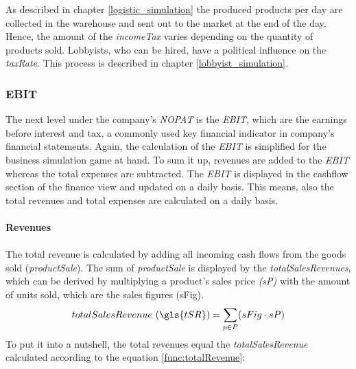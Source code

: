 As described in chapter \ref{logistic_simulation} the produced products per day are collected in the warehouse and sent out to the market at the end of the day. Hence, the amount of the \textit{incomeTax} varies depending on the quantity of products sold. Lobbyists, who can be hired, have a political influence on the \textit{taxRate}. This process is described in chapter \ref{lobbyist_simulation}.

\subsubsection{EBIT}

The next level under the company's \textit{NOPAT} is the \textit{EBIT}, which are the earnings before interest and tax, a commonly used key financial indicator in company's financial statements. \cite{lee_e_2006} Again, the calculation of the \textit{EBIT} is simplified for the business simulation game at hand. To sum it up, %
revenues are added to the \textit{EBIT} whereas the total expenses are subtracted. The \textit{EBIT} is displayed in the cashflow section of the finance view and updated on a daily basis. This means, also the total revenues and total expenses are calculated on a daily basis.\\
\\
\textbf{Revenues}\\
\\
The total revenue is calculated by adding all incoming cash flows from the goods sold (\textit{productSale}). The sum of \textit{productSale} is displayed by the \textit{totalSalesRevenues}, which can be derived by multiplying a product’s sales price \textit{(sP)} with the amount of units sold, which are the sales figures (\gls{sFig}). 
    \begin{equation}
        totalSalesRevenue~(\gls{tSR}) = \sum_{p \in P}(sFig \cdot sP) 
    \end{equation}
To put it into a nutshell, the total revenues equal the \textit{totalSalesRevenue} calculated according to the equation \ref{func:totalRevenue}:

